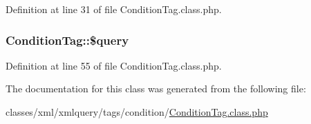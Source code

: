 Definition at line 31 of file Condition\-Tag.\-class.\-php.

\hypertarget{classConditionTag_ab186510e6366ad1033cc9d73cedf1f02}{
\subsubsection[{\$query}]{\setlength{\rightskip}{0pt plus 5cm}Condition\-Tag\-::\$query}}\label{classConditionTag_ab186510e6366ad1033cc9d73cedf1f02}


Definition at line 55 of file Condition\-Tag.\-class.\-php.



The documentation for this class was generated from the following file\-:\begin{DoxyCompactItemize}
\item 
classes/xml/xmlquery/tags/condition/\hyperlink{ConditionTag_8class_8php}{Condition\-Tag.\-class.\-php}\end{DoxyCompactItemize}
